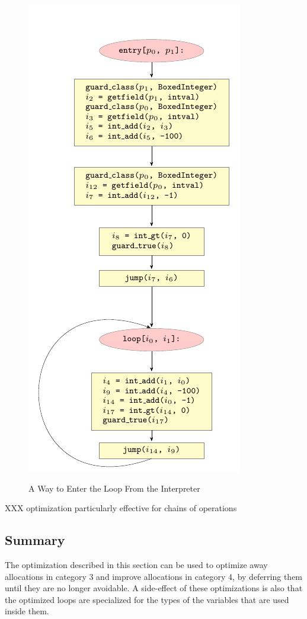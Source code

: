 \documentclass{sigplanconf}
\begin{document}
\begin{figure}
\includegraphics{figures/step4.pdf}
\label{fig:step3}
\caption{A Way to Enter the Loop From the Interpreter}
\end{figure}

XXX optimization particularly effective for chains of operations


\subsection{Summary}

The optimization described in this section can be used to optimize away
allocations in category 3 and improve allocations in category 4, by deferring
them until they are no longer avoidable. A side-effect of these optimizations
is also that the optimized loops are specialized for the types of the variables
that are used inside them.
\end{document}
